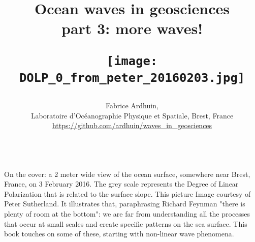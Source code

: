 \documentclass[a4paper]{book}  %
\begin{document}
\title{{\Huge Ocean waves in geosciences }
{\Large \\  part 3: more waves!}
 \vspace{0.1cm}\\
   \centerline{\texttt{[image: DOLP\_0\_from\_peter\_20160203.jpg]}}}
\author{Fabrice Ardhuin, \\
Laboratoire d'Oc{\'e}anographie Physique et Spatiale, Brest,
France \\
 \url{https://github.com/ardhuin/waves_in_geosciences} \\
\vspace{1.5cm}\\
} \maketitle
\clearpage
On the cover: a 2 meter wide view of the ocean surface, somewhere near Brest, France, on 3 February 2016. The grey scale represents the Degree of Linear Polarization that is related to the surface slope. This picture Image courtesy of Peter Sutherland. It illustrates that, paraphrasing Richard Feynman  "there is plenty of room at the bottom": we are far from understanding all the processes that occur at small scales and create specific patterns on the sea surface. This book touches on some of these, starting with non-linear wave phenomena. 
 \cleardoublepage
{}

\setcounter{page}{3}

\tableofcontents
\cleardoublepage


\setcounter{chapter}{20}

\end{document}
